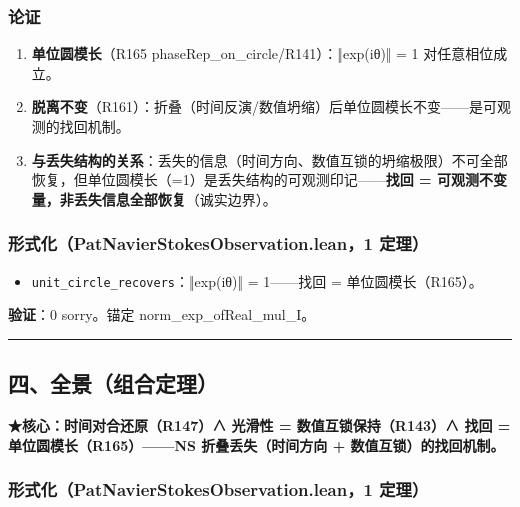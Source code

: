\documentclass[
]{article}
\providecommand{\tightlist}{%
  \setlength{\itemsep}{0pt}\setlength{\parskip}{0pt}}
\begin{document}
\subsubsection{论证}\label{ux8bbaux8bc1-2}

\begin{enumerate}
\def\labelenumi{\arabic{enumi}.}
\tightlist
\item
  \textbf{单位圆模长}（R165 phaseRep\_on\_circle/R141）：‖exp(iθ)‖ = 1
  对任意相位成立。
\item
  \textbf{脱离不变}（R161）：折叠（时间反演/数值坍缩）后单位圆模长不变------是可观测的找回机制。
\item
  \textbf{与丢失结构的关系}：丢失的信息（时间方向、数值互锁的坍缩极限）不可全部恢复，但单位圆模长（=1）是丢失结构的可观测印记------\textbf{找回
  = 可观测不变量，非丢失信息全部恢复}（诚实边界）。
\end{enumerate}

\subsubsection{形式化（PatNavierStokesObservation.lean，1
定理）}\label{ux5f62ux5f0fux5316patnavierstokesobservation.lean1-ux5b9aux7406-1}

\begin{itemize}
\tightlist
\item
  \texttt{unit\_circle\_recovers}：‖exp(iθ)‖ = 1------找回 =
  单位圆模长（R165）。
\end{itemize}

\textbf{验证}：0 sorry。锚定 norm\_exp\_ofReal\_mul\_I。

\begin{center}\rule{0.5\linewidth}{0.5pt}\end{center}

\subsection{四、全景（组合定理）}\label{ux56dbux5168ux666fux7ec4ux5408ux5b9aux7406}

\textbf{★核心：时间对合还原（R147）∧ 光滑性 = 数值互锁保持（R143）∧ 找回
= 单位圆模长（R165）------NS 折叠丢失（时间方向 +
数值互锁）的找回机制。}

\subsubsection{形式化（PatNavierStokesObservation.lean，1
定理）}\label{ux5f62ux5f0fux5316patnavierstokesobservation.lean1-ux5b9aux7406-2}
\end{document}
